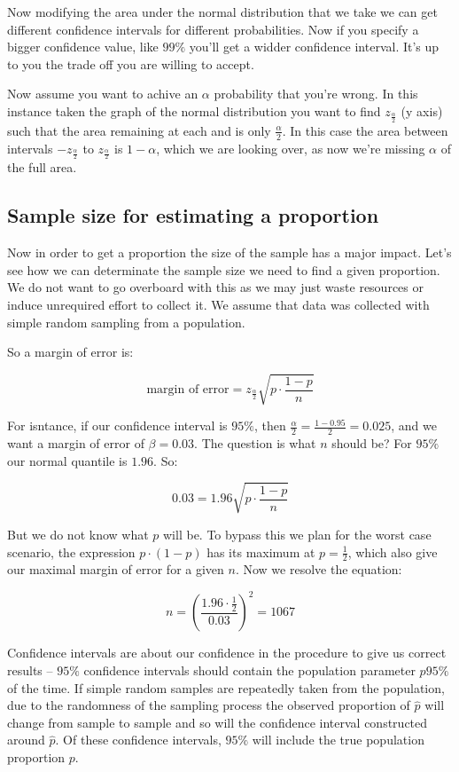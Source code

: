 Now modifying the area under the normal distribution that we take we can get
different confidence intervals for different probabilities. Now if you specify a
bigger confidence value, like $99\%$ you'll get a widder confidence interval.
It's up to you the trade off you are willing to accept.

Now assume you want to achive an $\alpha$ probability that you're wrong. In
this instance taken the graph of the normal distribution you want to find
$z_{\frac{\alpha}{2}}$ (y axis) such that the area remaining at each and is only
$\frac{\alpha}{2}$. In this case the area between intervals
$-z_{\frac{\alpha}{2}}$ to $z_{\frac{\alpha}{2}}$ is $1-\alpha$, which we are
looking over, as now we're missing $\alpha$ of the full area.

\subsection{Sample size for estimating a proportion}

Now in order to get a proportion the size of the sample has a major impact.
Let's see how we can determinate the sample size we need to find a given
proportion. We do not want to go overboard with this as we may just waste
resources or induce unrequired effort to collect it. We assume that data was
collected with simple random sampling from a population.

So a margin of error is: 

\[ \mbox{margin of error} = z_{\frac{\alpha}{2}}\sqrt{p \cdot
\frac{1-p}{n}}\]

For isntance, if our confidence interval is $95\%$, then 
$\frac{\alpha}{2}=\frac{1-0.95}{2}=0.025$, and we want a margin of error of
$\beta=0.03$. The question is what $n$ should be? For $95\%$ our normal quantile
is $1.96$. So:

\[ 0.03 = 1.96\sqrt{p \cdot
\frac{1-p}{n}}\]
 
 But we do not know what $p$ will be. To bypass this we plan for the worst case
 scenario, the expression $p\cdot(1-p)$ has its maximum at $p=\frac{1}{2}$,
 which also give our maximal margin of error for a given $n$. Now we resolve the
 equation:
 
 \[ n=\left( \frac{1.96 \cdot \frac{1}{2}}{0.03} \right)^2 = 1067 \]

Confidence intervals are about our confidence in the procedure to give us
correct results -- $95\%$ confidence intervals should contain the population
parameter $p 95\%$ of the time. If simple random samples are repeatedly taken
from the population, due to the randomness of the sampling process the observed
proportion of $\hat{p}$ will change from sample to sample and so will the
confidence interval constructed around $\hat{p}$. Of these confidence intervals,
$95\%$ will include the true population proportion $p$.

